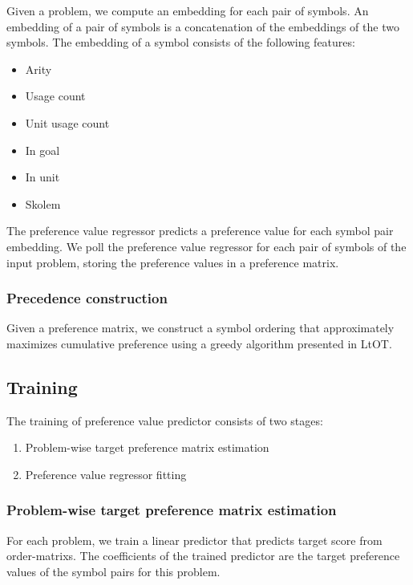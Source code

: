 Given a problem, we compute an embedding for each pair of symbols.
An embedding of a pair of symbols is a concatenation of the embeddings of the two symbols.
The embedding of a symbol consists of the following features:

\begin{itemize}
	\item Arity
	\item Usage count
	\item Unit usage count
	\item In goal
	\item In unit
	\item Skolem
\end{itemize}

The preference value regressor predicts a preference value for each symbol pair embedding.
We poll the preference value regressor for each pair of symbols of the input problem,
storing the preference values in a preference matrix.

\subsubsection{Precedence construction}

Given a preference matrix, we construct a symbol ordering
that approximately maximizes cumulative preference
using a greedy algorithm presented in LtOT.

\subsection{Training}

The training of preference value predictor consists of two stages:

\begin{enumerate}
	\item Problem-wise target preference matrix estimation
	\item Preference value regressor fitting
\end{enumerate}

\subsubsection{Problem-wise target preference matrix estimation}

For each problem,
we train a linear predictor
that predicts target score from \glspl{order-matrix}.
The coefficients of the trained predictor are the target preference values of the symbol pairs for this problem.

